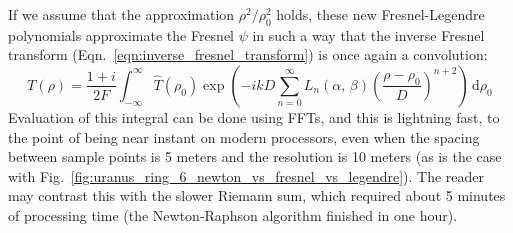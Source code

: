 \documentclass{article}
\theoremstyle{plain}
\begin{document}
        \par\hfill\par
        If we assume that the approximation $\rho^{2}/\rho_{0}^{2}$ holds,
        these new Fresnel-Legendre polynomials approximate the Fresnel $\psi$
        in such a way that the inverse Fresnel transform
        (Eqn.~\ref{eqn:inverse_fresnel_transform}) is once again a convolution:
        \begin{equation}
            T(\rho)=\frac{1+i}{2F}\int_{-\infty}^{\infty}
                \hat{T}(\rho_{0})
                \exp\left(
                    -ikD\sum_{n=0}^{\infty}L_{n}(\alpha,\,\beta)
                    \left(\frac{\rho-\rho_{0}}{D}\right)^{n+2}
                \right)\,\textrm{d}\rho_{0}
        \end{equation}
        Evaluation of this integral can be done using FFTs, and this is
        lightning fast, to the point of being near instant on modern processors,
        even when the spacing between sample points is 5 meters and the
        resolution is 10 meters (as is the case with
        Fig.~\ref{fig:uranus_ring_6_newton_vs_fresnel_vs_legendre}).
        The reader may contrast this with the slower Riemann sum,
        which required about 5 minutes of processing time
        (the Newton-Raphson algorithm finished in one hour).
\end{document}
